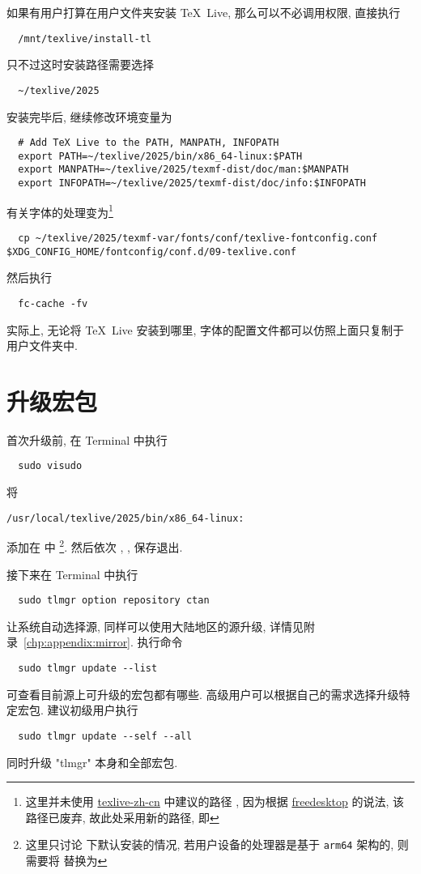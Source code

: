 如果有用户打算在用户文件夹安装 \TeX~Live,
那么可以不必调用权限,
直接执行
\begin{lstlisting}
  /mnt/texlive/install-tl
\end{lstlisting}
只不过这时安装路径需要选择
\begin{lstlisting}
  ~/texlive/2025
\end{lstlisting}
安装完毕后,
继续修改环境变量为
\begin{lstlisting}
  # Add TeX Live to the PATH, MANPATH, INFOPATH
  export PATH=~/texlive/2025/bin/x86_64-linux:$PATH
  export MANPATH=~/texlive/2025/texmf-dist/doc/man:$MANPATH
  export INFOPATH=~/texlive/2025/texmf-dist/doc/info:$INFOPATH
\end{lstlisting}
有关字体的处理变为\footnote{这里并未使用 \href{https://tug.org/texlive/doc/texlive-zh-cn/texlive-zh-cn.pdf}{\textsf{texlive-zh-cn}} 中建议的路径 ,
因为根据 \href{https://www.freedesktop.org/software/fontconfig/fontconfig-user.html}{freedesktop} 的说法,
该路径已废弃,
故此处采用新的路径,
即 }
\begin{lstlisting}
  cp ~/texlive/2025/texmf-var/fonts/conf/texlive-fontconfig.conf $XDG_CONFIG_HOME/fontconfig/conf.d/09-texlive.conf
\end{lstlisting}
然后执行
\begin{lstlisting}
  fc-cache -fv
\end{lstlisting}
实际上,
无论将 \TeX~Live 安装到哪里,
字体的配置文件都可以仿照上面只复制于用户文件夹中.

\section{升级宏包}\label{sec:ubuntu:update}

首次升级前,
在 \textsf{Terminal} 中执行
\begin{lstlisting}
  sudo visudo
\end{lstlisting}
将
\begin{lstlisting}[language = {}]
  /usr/local/texlive/2025/bin/x86_64-linux:
\end{lstlisting}
添加在  中%
\footnote{这里只讨论  下默认安装的情况,
若用户设备的处理器是基于 \texttt{arm64} 架构的,
则需要将  替换为 }.
然后依次 , , \keys{\enter} 保存退出.

接下来在 \textsf{Terminal} 中执行
\begin{lstlisting}
  sudo tlmgr option repository ctan
\end{lstlisting}
让系统自动选择源,
同样可以使用大陆地区的源升级,
详情见附录~\ref{chp:appendix:mirror}.
执行命令
\begin{lstlisting}
  sudo tlmgr update --list
\end{lstlisting}
可查看目前源上可升级的宏包都有哪些.
高级用户可以根据自己的需求选择升级特定宏包.
建议初级用户执行
\begin{lstlisting}
  sudo tlmgr update --self --all
\end{lstlisting}
同时升级 "tlmgr" 本身和全部宏包.

